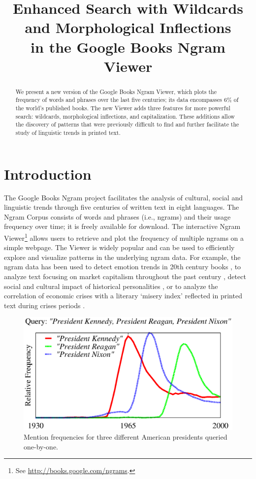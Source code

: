 \documentclass[11pt,a4paper]{article}
\title{Enhanced Search with Wildcards and Morphological Inflections\\in the Google Books Ngram Viewer}
\date{}
\begin{document}
\maketitle

\begin{abstract}

We present a new version of the Google Books Ngram Viewer, which plots
the frequency of words and phrases over the last five
centuries; its data encompasses 6\% of the world's published books.
The new Viewer adds three features for more powerful search: wildcards,
morphological inflections, and capitalization. These additions allow
the discovery of patterns that were previously difficult to find
and further facilitate the study of linguistic trends in printed text.

\end{abstract}

\section{Introduction}

The Google Books Ngram project facilitates the analysis of cultural, social and linguistic trends through five centuries of written text in eight languages. The Ngram Corpus \cite{culturomics,lin2012syntactic} consists of words and phrases (i.e., ngrams) and their usage frequency over time; it is freely available for download. The interactive Ngram Viewer\footnote{See \url{http://books.google.com/ngrams}.} allows users to retrieve and plot the frequency of multiple ngrams on a simple webpage. The Viewer is widely popular and can be used to efficiently explore and visualize patterns in the underlying ngram data. For example, the ngram data has been used to detect emotion trends in 20th century books \cite{acerbi.etal.2013}, to analyze text focusing on market capitalism throughout the past century \cite{Schulz2013}, detect social and cultural impact of historical personalities \cite{skiena.ward.2013}, or to analyze the correlation of economic crises with a literary `misery index' reflected in printed text during crises periods \cite{bentley.et.al.2014}.

\begin{figure}[t]
\includegraphics[width=\columnwidth]{graphs/kenreanixon}
\caption{\label{fig:manual}Mention frequencies for three different American presidents queried one-by-one.
\vspace{-1.5em}}
\end{figure}
\end{document}
